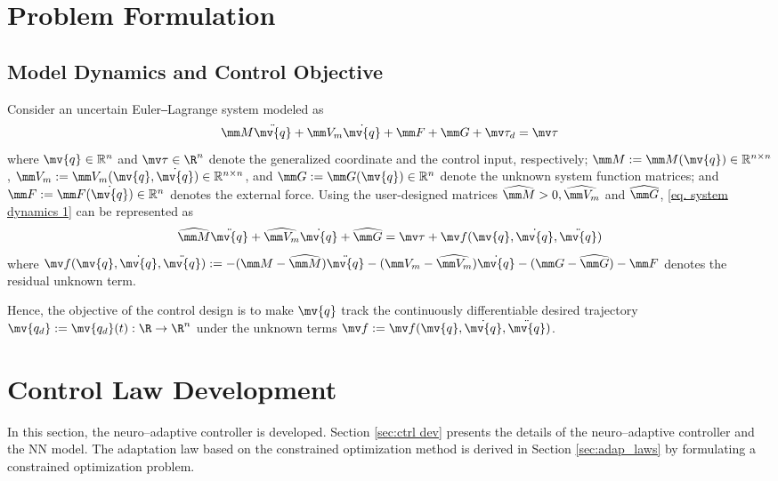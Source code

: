 \documentclass[letterpaper, 10 pt, conference]{ieeeconf}  %
\newcommand*{\q}{\mv{q}}
\newcommand*{\dq}{\dot{\q}}
\newcommand*{\ddq}{\ddot{\q}}
\newcommand*{\qd}{\mv{q_d}}
\begin{document}
\section{Problem Formulation}\label{sec: Problem Formulation}

\subsection{Model Dynamics and Control Objective}

Consider an uncertain Euler‒Lagrange system modeled as
\begin{equation}
    \mm M\ddq + \mm V_m\dq + \mm F + \mm G + \mv\tau_d
    =
    \mv\tau 
    \label{eq. system dynamics 1}
\end{equation}
where $\q\in \mathbb{R}^n$ and $\mv \tau\in\R^n$ denote the generalized coordinate and the control input, respectively; $\mm M :=\mm M(\q)\in\mathbb{R}^{n\times n}$, $\mm V_m:= \mm V_m(\q,\dq)\in\mathbb{R}^{n\times n}$, and $\mm G:=\mm G(\q)\in\mathbb{R}^{n}$ denote the unknown system function matrices; and $\mm F:=\mm F(\dq)\in\mathbb{R}^{n}$ denotes the external force.
Using the user-designed matrices $\widehat{\mm M}>0,\widehat{\mm V_m}$ and $\widehat{\mm G}$, \eqref{eq. system dynamics 1} can be represented as 
\begin{equation}
    \widehat{\mm M}\ddq+\widehat{\mm V_m}\dq+\widehat{\mm G} = \mv \tau + \mv f(\q,\dq,\ddq)
    \label{eq. system dynamics 2}
\end{equation}
where $\mv f(\q,\dq,\ddq) := -(\mm M-\widehat{\mm M})\ddq-(\mm V_m-\widehat{\mm V_m})\dq -(\mm G-\widehat{\mm G}) -\mm F$ denotes the residual unknown term.

Hence, the objective of the control design is to make $\q$ track the continuously differentiable desired trajectory $\qd:=\qd(t):\R\to \R^n$ under the unknown terms $\mv f:=\mv f(\q,\dq,\ddq)$.

\section{Control Law Development}\label{sec:ctrl design}

In this section, the neuro–adaptive controller is developed.
Section \ref{sec:ctrl dev} presents the details of the neuro–adaptive controller and the NN model.
The adaptation law based on the constrained optimization method is derived in Section \ref{sec:adap_laws} by formulating a constrained optimization problem.
\end{document}
